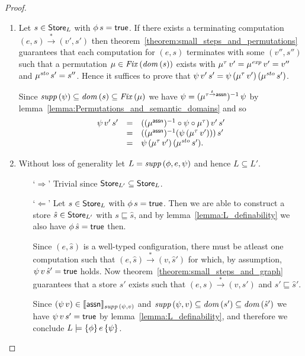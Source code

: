 \documentclass[12pt,a4paper]{report}
\newcommand{\sexp}{\nstyle{exp}}
\newcommand{\ssto}{\nstyle{sto}}
\newcommand{\Fix}[1]{\nstyle{Fix}\,(#1)}
\begin{document}
\begin{proof} \
  \begin{enumerate}
    \item Let $s \in \mathsf{Store}_L$ with $\phi\,s = \mathsf{true}$. If there exists a terminating computation $(e,s) \xrightarrow* (v',s')$
          then theorem~\ref{theorem:small_steps_and_permutations} guarantees that each computation for $(e,s)$
          terminates with some $(v'',s'')$ such that a permutation $\mu\in\Fix{\dom{s}}$ exists with
          $\mu^\tau\,v' = \mu^\sexp\,v' = v''$ and $\mu^\ssto\,s' = s''$.
          Hence it suffices to prove that $\psi\,v'\,s' = \psi\,(\mu^\tau\,v')\,(\mu^\ssto\,s')$.

          Since $\supp{\psi} \subseteq \dom{s} \subseteq \Fix{\mu}$ we have $\psi = (\mu^{\tau\stackrel{_t}{\to}\mathsf{assn}})^{-1}\,\psi$ by
          lemma~\ref{lemma:Permutations_and_semantic_domains} and so
          \[\begin{array}{rcl}
            \psi\,v'\,s' &=& ((\mu^\tassn)^{-1} \circ \psi \circ \mu^\tau)\,v'\,s' \\
                         &=& ((\mu^\tassn)^{-1} (\psi\,(\mu^\tau\,v')))\,s' \\
                         &=& \psi\,(\mu^\tau\,v')\,(\mu^\ssto\,s').
          \end{array}\]

    \item Without loss of generality let $L= \mathit{supp}\,(\phi,e,\psi)$ and hence $L \subseteq L'$.
          \begin{itemize}
            \item[`$\Rightarrow$']
                  Trivial since $\mathsf{Store}_{L'} \subseteq \mathsf{Store}_L$.

            \item[`$\Leftarrow$']
                  Let $s \in \mathsf{Store}_L$ with $\phi\,s = \mathsf{true}$. Then we are able to construct a store $\hat{s}\in\mathsf{Store}_{L'}$
                  with $s \sqsubseteq \hat{s}$, and by lemma~\ref{lemma:L_definability} we also have $\phi\,\hat{s}=\mathsf{true}$
                  then.

                  Since $(e,\hat{s})$ is a well-typed configuration, there must be atleast one computation such that
                  $(e,\hat{s}) \xrightarrow* (v,\hat{s}')$ for which, by assumption, $\psi\,v\,\hat{s}'=\mathsf{true}$ holds.
                  Now theorem~\ref{theorem:small_steps_and_graph} guarantees that a store $s'$ exists such that
                  $(e,s) \xrightarrow* (v,s')$ and $s' \sqsubseteq \hat{s}'$.

                  Since $(\psi\,v) \in \llbracket\mathsf{assn}\rrbracket_{\mathit{supp}\,(\psi,v)}$ and 
                  $\mathit{supp}\,(\psi,v)\subseteq\mathit{dom}\,(s')\subseteq\mathit{dom}\,(\hat{s}')$ we have $\psi\,v\,s' = \mathsf{true}$ by
                  lemma~\ref{lemma:L_definability}, and therefore we conclude $L\models\{\phi\}\,e\,\{\psi\}$.
          \end{itemize}
  \end{enumerate}
\end{proof}
\end{document}
